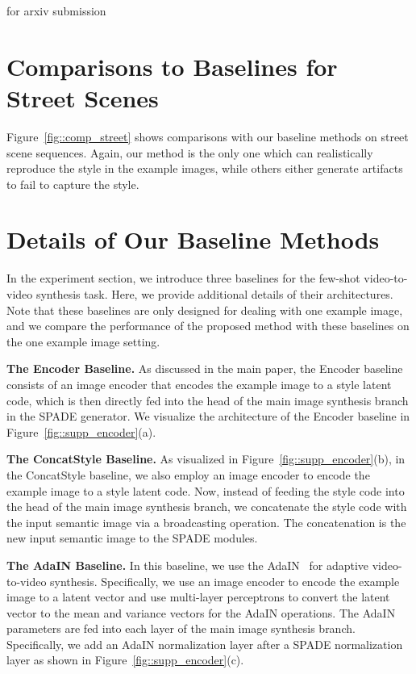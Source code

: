 \documentclass{article}
\def\arxiv{for arxiv submission}
\begin{document}
\ifdefined\arxiv
\clearpage
\appendix
\section{Comparisons to Baselines for Street Scenes}
Figure~\ref{fig::comp_street} shows comparisons with our baseline methods on street scene sequences. Again, our method is the only one which can realistically reproduce the style in the example images, while others either generate artifacts to fail to capture the style.


\section{Details of Our Baseline Methods}
In the experiment section, we introduce three baselines for the few-shot video-to-video synthesis task. Here, we provide additional details of their architectures. Note that these baselines are only designed for dealing with one example image, and we compare the performance of the proposed method with these baselines on the one example image setting. 

{\bf The Encoder Baseline.}
As discussed in the main paper, the Encoder baseline consists of an image encoder that encodes the example image to a style latent code, which is then directly fed into the head of the main image synthesis branch in the SPADE generator. We visualize the architecture of the Encoder baseline in Figure~\ref{fig::supp_encoder}(a).

{\bf The ConcatStyle Baseline.} 
As visualized in Figure~\ref{fig::supp_encoder}(b), in the ConcatStyle baseline, we also employ an image encoder to encode the example image to a style latent code. Now, instead of feeding the style code into the head of the main image synthesis branch, we concatenate the style code with the input semantic image via a broadcasting operation. The concatenation is the new input semantic image to the SPADE modules.

{\bf The AdaIN Baseline.}  
In this baseline, we use the AdaIN~\cite{huang2017adain} for adaptive video-to-video synthesis. Specifically, we use an image encoder to encode the example image to a latent vector and use multi-layer perceptrons to convert the latent vector to the mean and variance vectors for the AdaIN operations. The AdaIN parameters are fed into each layer of the main image synthesis branch. Specifically, we add an AdaIN normalization layer after a SPADE normalization layer as shown in Figure~\ref{fig::supp_encoder}(c).
\end{document}
